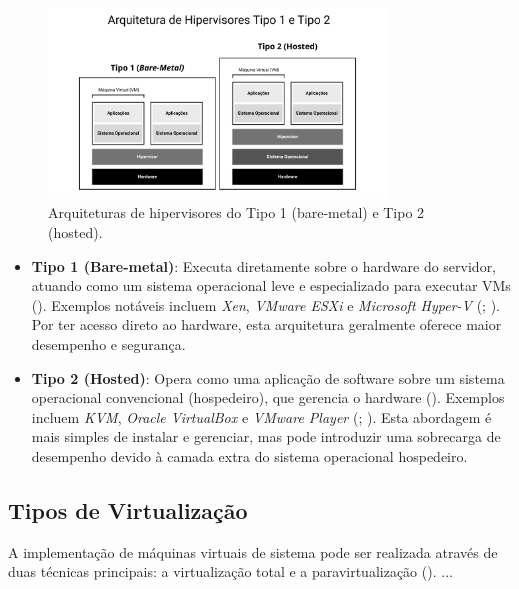 \begin{itemize}
\begin{figure}[htb]
    \centering
    \includegraphics[width=0.8\textwidth]{figuras/Figura 2 - Arquitetura de Hipervisores.png}
    \caption{Arquiteturas de hipervisores do Tipo 1 (bare-metal) e Tipo 2 (hosted).}
    \label{fig:arquitetura-hipervisores}
\end{figure}

\begin{itemize}
    \item \textbf{Tipo 1 (Bare-metal)}: Executa diretamente sobre o hardware do servidor, atuando como um sistema operacional leve e especializado para executar VMs (\cite{chawla2025}). Exemplos notáveis incluem \textit{Xen}, \textit{VMware ESXi} e \textit{Microsoft Hyper-V} (\cite{chawla2025}; \cite{carissimi2008}). Por ter acesso direto ao hardware, esta arquitetura geralmente oferece maior desempenho e segurança.
    \item \textbf{Tipo 2 (Hosted)}: Opera como uma aplicação de software sobre um sistema operacional convencional (hospedeiro), que gerencia o hardware (\cite{chawla2025}). Exemplos incluem \textit{KVM}, \textit{Oracle VirtualBox} e \textit{VMware Player} (\cite{chawla2025}; \cite{carissimi2008}). Esta abordagem é mais simples de instalar e gerenciar, mas pode introduzir uma sobrecarga de desempenho devido à camada extra do sistema operacional hospedeiro.
\end{itemize}

\subsection{Tipos de Virtualização}
A implementação de máquinas virtuais de sistema pode ser realizada através de duas técnicas principais: a virtualização total e a paravirtualização (\cite{carissimi2008}).
{{ ... }}


\end{itemize}
